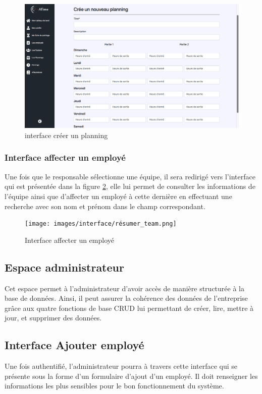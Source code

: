 \begin{figure}[h!]
    \vspace{-10pt}
    \centering
    \includegraphics[scale=0.305 ]{images/interface/add_planning.png}
    \caption{interface créer un planning}
    \label{fig99}
\end{figure}

\vspace{-20pt}
\subsubsection*{Interface affecter un employé}
Une fois que le responsable sélectionne une équipe, il sera redirigé vers
l'interface qui est présentée dans la figure \ref{fig100}, elle lui permet de
consulter les informations de l'équipe ainsi que d'affecter un employé à cette
dernière en effectuant une recherche avec son nom et prénom dans le champ
correspondant. 

\begin{figure}[h!]
    \centering
    \texttt{[image: images/interface/résumer\_team.png]}
    \caption{Interface affecter un employé}
    \label{fig100}
\end{figure}

\clearpage

\subsection{Espace administrateur}
Cet espace permet à l’administrateur d’avoir accès de manière structurée à la 
base de données. Ainsi, il peut assurer la cohérence des données de l’entreprise 
grâce aux quatre fonctions de base CRUD lui permettant de créer, lire, mettre à 
jour, et supprimer des données.

\subsection*{Interface Ajouter employé}
Une fois authentifié, l’administrateur pourra à travers cette interface qui se
présente sous la forme d’un formulaire d'ajout d'un employé. Il doit renseigner
les informations les plus sensibles pour le bon fonctionnement du système.  

